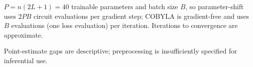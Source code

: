 \begin{table}[H]
  \centering
  \caption{Supplementary optimizer diagnostic (Breast Cancer, $n=8$, $L=2$, angle, $\epsilon_{2q}=10^{-2}$)}
  \label{tab:ablation_optimizer}
  \small
  \setlength{\tabcolsep}{4pt}
  \begin{tablenotes}
    \small
    \item $P=n(2L+1)=40$ trainable parameters and batch size $B$, so parameter-shift uses $2PB$ circuit evaluations per gradient step; COBYLA is gradient-free and uses $B$ evaluations (one loss evaluation) per iteration. Iterations to convergence are approximate.
  \end{tablenotes}
\end{table}
\FloatBarrier

\begin{table}[H]
  \centering
  \caption{Supplementary PCA/feature-selection diagnostic (Breast Cancer, $n=8$, $L=2$, Adam, $\epsilon_{2q}=10^{-2}$)}
  \label{tab:ablation_pca}
  \small
  \setlength{\tabcolsep}{4pt}
  \begin{tablenotes}
    \small
    \item Point-estimate gaps are descriptive; preprocessing is insufficiently specified for inferential use.
  \end{tablenotes}
\end{table}
\FloatBarrier

